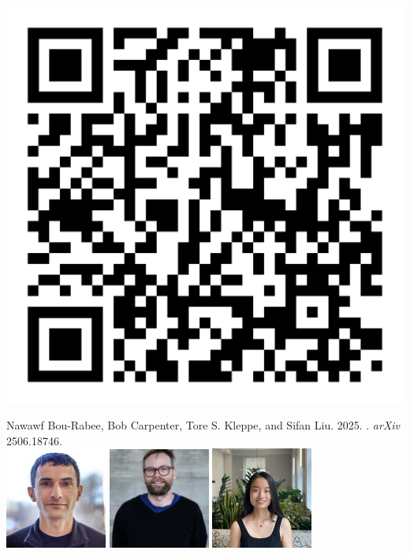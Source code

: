 \documentclass[10pt]{report}
\begin{document}
\\[8pt]
\spc
\noindent
\begin{minipage}[t]{0.35\textwidth}
\includegraphics[width=\textwidth]{img/qr-code.pdf}
\end{minipage}
\quad
\begin{minipage}[t]{0.6\textwidth}
  \vspace*{-1.55in}
  {\small Nawawf Bou-Rabee, Bob Carpenter, Tore S. Kleppe, and Sifan Liu.
      2025. . \textit{arXiv} 2506.18746.}
      \\[12pt]
      \includegraphics[width=0.25\textwidth]{img/nawaf.jpg}
      \hfill
      \includegraphics[width=0.25\textwidth]{img/tore.png}
      \hfill
      \includegraphics[width=0.25\textwidth]{img/sifan.jpg}
\end{minipage}
\hfill
\null
\end{document}
